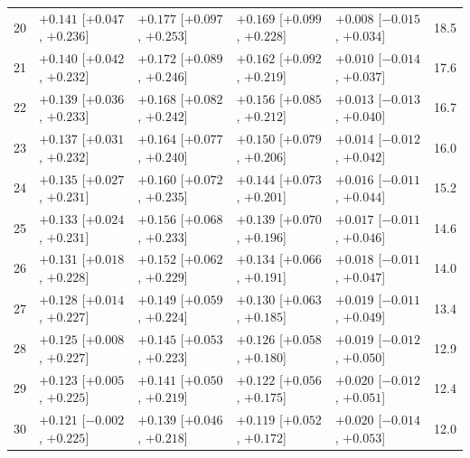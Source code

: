 \begin{longtable}{rllllr}
20 & $+0.141$ {\scriptsize [$+0.047$, $+0.236$]} & $+0.177$ {\scriptsize [$+0.097$, $+0.253$]} & $+0.169$ {\scriptsize [$+0.099$, $+0.228$]} & $+0.008$ {\scriptsize [$-0.015$, $+0.034$]} & 18.5 \\
21 & $+0.140$ {\scriptsize [$+0.042$, $+0.232$]} & $+0.172$ {\scriptsize [$+0.089$, $+0.246$]} & $+0.162$ {\scriptsize [$+0.092$, $+0.219$]} & $+0.010$ {\scriptsize [$-0.014$, $+0.037$]} & 17.6 \\
22 & $+0.139$ {\scriptsize [$+0.036$, $+0.233$]} & $+0.168$ {\scriptsize [$+0.082$, $+0.242$]} & $+0.156$ {\scriptsize [$+0.085$, $+0.212$]} & $+0.013$ {\scriptsize [$-0.013$, $+0.040$]} & 16.7 \\
23 & $+0.137$ {\scriptsize [$+0.031$, $+0.232$]} & $+0.164$ {\scriptsize [$+0.077$, $+0.240$]} & $+0.150$ {\scriptsize [$+0.079$, $+0.206$]} & $+0.014$ {\scriptsize [$-0.012$, $+0.042$]} & 16.0 \\
24 & $+0.135$ {\scriptsize [$+0.027$, $+0.231$]} & $+0.160$ {\scriptsize [$+0.072$, $+0.235$]} & $+0.144$ {\scriptsize [$+0.073$, $+0.201$]} & $+0.016$ {\scriptsize [$-0.011$, $+0.044$]} & 15.2 \\
25 & $+0.133$ {\scriptsize [$+0.024$, $+0.231$]} & $+0.156$ {\scriptsize [$+0.068$, $+0.233$]} & $+0.139$ {\scriptsize [$+0.070$, $+0.196$]} & $+0.017$ {\scriptsize [$-0.011$, $+0.046$]} & 14.6 \\
26 & $+0.131$ {\scriptsize [$+0.018$, $+0.228$]} & $+0.152$ {\scriptsize [$+0.062$, $+0.229$]} & $+0.134$ {\scriptsize [$+0.066$, $+0.191$]} & $+0.018$ {\scriptsize [$-0.011$, $+0.047$]} & 14.0 \\
27 & $+0.128$ {\scriptsize [$+0.014$, $+0.227$]} & $+0.149$ {\scriptsize [$+0.059$, $+0.224$]} & $+0.130$ {\scriptsize [$+0.063$, $+0.185$]} & $+0.019$ {\scriptsize [$-0.011$, $+0.049$]} & 13.4 \\
28 & $+0.125$ {\scriptsize [$+0.008$, $+0.227$]} & $+0.145$ {\scriptsize [$+0.053$, $+0.223$]} & $+0.126$ {\scriptsize [$+0.058$, $+0.180$]} & $+0.019$ {\scriptsize [$-0.012$, $+0.050$]} & 12.9 \\
29 & $+0.123$ {\scriptsize [$+0.005$, $+0.225$]} & $+0.141$ {\scriptsize [$+0.050$, $+0.219$]} & $+0.122$ {\scriptsize [$+0.056$, $+0.175$]} & $+0.020$ {\scriptsize [$-0.012$, $+0.051$]} & 12.4 \\
30 & $+0.121$ {\scriptsize [$-0.002$, $+0.225$]} & $+0.139$ {\scriptsize [$+0.046$, $+0.218$]} & $+0.119$ {\scriptsize [$+0.052$, $+0.172$]} & $+0.020$ {\scriptsize [$-0.014$, $+0.053$]} & 12.0 \\

\end{longtable}
